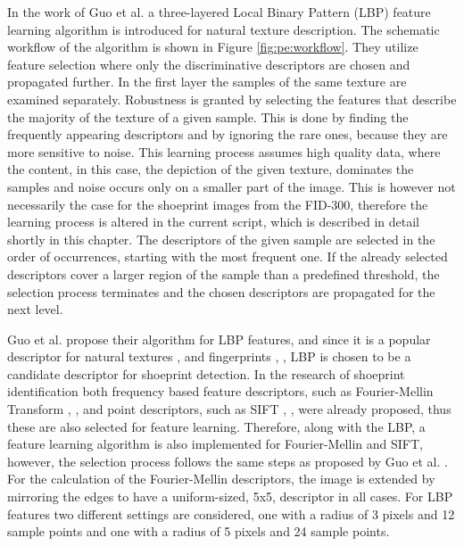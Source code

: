 \documentclass[draft,final]{vutinfth} %
\begin{document}
\par
In the work of Guo et al. \cite{guo2012discriminative} a three-layered Local Binary Pattern (LBP) feature learning algorithm is introduced  for natural texture description.
The schematic workflow of the algorithm is shown in Figure \ref{fig:pe:workflow}.
They utilize feature selection where only the discriminative descriptors are chosen and propagated further.
In the first layer the samples of the same texture are examined separately.
Robustness is granted by selecting the features that describe the majority of the texture of a given sample.
This is done by finding the frequently appearing descriptors and by ignoring the rare ones, because they are more sensitive to noise.
This learning process assumes high quality data, where the content, in this case, the depiction of the given texture, dominates the samples and noise occurs only on a smaller part of the image.
This is however not necessarily the case for the shoeprint images from the FID-300, therefore the learning process is altered in the current script, which is described in detail shortly in this chapter.
The descriptors of the given sample are selected in the order of occurrences, starting with the most frequent one.
If the already selected descriptors cover a larger region of the sample than a predefined threshold, the selection process terminates and the chosen descriptors are propagated for the next level.
\par
Guo et al. \cite{guo2012discriminative} propose their algorithm for LBP features, and since it is a popular descriptor for natural textures \cite{hong2014combining}, \cite{ahonen2009rotation} and fingerprints \cite{wang2013pixel}, \cite{rida2018palmprint}, LBP is chosen to be a candidate descriptor for shoeprint detection.
In the research of shoeprint identification both frequency based feature descriptors, such as Fourier-Mellin Transform \cite{wu2019crime}, \cite{gueham2008automatic}, and point descriptors, such as SIFT \cite{nibouche2009rotation}, \cite{richetelli2017classification}, were already proposed, thus these are also selected for feature learning.
Therefore, along with the LBP, a feature learning algorithm is also implemented for Fourier-Mellin and SIFT, however, the selection process follows the same steps as proposed by Guo et al. \cite{guo2012discriminative}. 
For the calculation of the Fourier-Mellin descriptors, the image is extended by mirroring the edges to have a uniform-sized, 5x5, descriptor in all cases.
For LBP features two different settings are considered, one with a radius of 3 pixels and 12 sample points and one with a radius of 5 pixels and 24 sample points.
\end{document}
